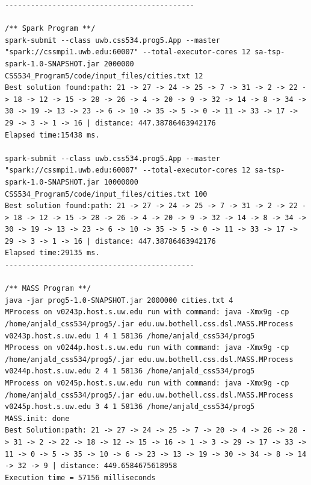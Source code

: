 \documentclass{article}
\begin{document}
\begin{lstlisting}
--------------------------------------------

/** Spark Program **/
spark-submit --class uwb.css534.prog5.App --master "spark://cssmpi1.uwb.edu:60007" --total-executor-cores 12 sa-tsp-spark-1.0-SNAPSHOT.jar 2000000 CSS534_Program5/code/input_files/cities.txt 12
Best solution found:path: 21 -> 27 -> 24 -> 25 -> 7 -> 31 -> 2 -> 22 -> 18 -> 12 -> 15 -> 28 -> 26 -> 4 -> 20 -> 9 -> 32 -> 14 -> 8 -> 34 -> 30 -> 19 -> 13 -> 23 -> 6 -> 10 -> 35 -> 5 -> 0 -> 11 -> 33 -> 17 -> 29 -> 3 -> 1 -> 16 | distance: 447.38786463942176
Elapsed time:15438 ms.

spark-submit --class uwb.css534.prog5.App --master "spark://cssmpi1.uwb.edu:60007" --total-executor-cores 12 sa-tsp-spark-1.0-SNAPSHOT.jar 10000000 CSS534_Program5/code/input_files/cities.txt 100
Best solution found:path: 21 -> 27 -> 24 -> 25 -> 7 -> 31 -> 2 -> 22 -> 18 -> 12 -> 15 -> 28 -> 26 -> 4 -> 20 -> 9 -> 32 -> 14 -> 8 -> 34 -> 30 -> 19 -> 13 -> 23 -> 6 -> 10 -> 35 -> 5 -> 0 -> 11 -> 33 -> 17 -> 29 -> 3 -> 1 -> 16 | distance: 447.38786463942176
Elapsed time:29135 ms.
--------------------------------------------

/** MASS Program **/
java -jar prog5-1.0-SNAPSHOT.jar 2000000 cities.txt 4
MProcess on v0243p.host.s.uw.edu run with command: java -Xmx9g -cp /home/anjald_css534/prog5/.jar edu.uw.bothell.css.dsl.MASS.MProcess v0243p.host.s.uw.edu 1 4 1 58136 /home/anjald_css534/prog5
MProcess on v0244p.host.s.uw.edu run with command: java -Xmx9g -cp /home/anjald_css534/prog5/.jar edu.uw.bothell.css.dsl.MASS.MProcess v0244p.host.s.uw.edu 2 4 1 58136 /home/anjald_css534/prog5
MProcess on v0245p.host.s.uw.edu run with command: java -Xmx9g -cp /home/anjald_css534/prog5/.jar edu.uw.bothell.css.dsl.MASS.MProcess v0245p.host.s.uw.edu 3 4 1 58136 /home/anjald_css534/prog5
MASS.init: done
Best Solution:path: 21 -> 27 -> 24 -> 25 -> 7 -> 20 -> 4 -> 26 -> 28 -> 31 -> 2 -> 22 -> 18 -> 12 -> 15 -> 16 -> 1 -> 3 -> 29 -> 17 -> 33 -> 11 -> 0 -> 5 -> 35 -> 10 -> 6 -> 23 -> 13 -> 19 -> 30 -> 34 -> 8 -> 14 -> 32 -> 9 | distance: 449.6584675618958
Execution time = 57156 milliseconds


			\end{lstlisting}	
	
\end{document}

